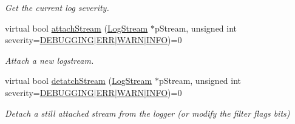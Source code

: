 \begin{DoxyCompactItemize}
\begin{DoxyCompactList}\small\item\em Get the current log severity. \end{DoxyCompactList}\item 
virtual bool \hyperlink{class_assimp_1_1_logger_a56fbf4f392712f06d3c5bb581c3f3906}{attach\-Stream} (\hyperlink{class_assimp_1_1_log_stream}{Log\-Stream} $\ast$p\-Stream, unsigned int severity=\hyperlink{class_assimp_1_1_logger_acd0b52a87d6fc11e957ed2c6e2ad75b6a1c233dd8bb46dc4386948a03877b8160}{D\-E\-B\-U\-G\-G\-I\-N\-G}$\vert$\hyperlink{class_assimp_1_1_logger_acd0b52a87d6fc11e957ed2c6e2ad75b6a2dd325191d60507ab0afd01ea3add8d1}{E\-R\-R}$\vert$\hyperlink{class_assimp_1_1_logger_acd0b52a87d6fc11e957ed2c6e2ad75b6abea27a64e7f7cc758549526f953c26f2}{W\-A\-R\-N}$\vert$\hyperlink{class_assimp_1_1_logger_acd0b52a87d6fc11e957ed2c6e2ad75b6a5631a164f078d5f7e8780cf88d1d45d6}{I\-N\-F\-O})=0
\begin{DoxyCompactList}\small\item\em Attach a new logstream. \end{DoxyCompactList}\item 
virtual bool \hyperlink{class_assimp_1_1_logger_ac89b2edd326dda9046fe9d4e1f4d10fc}{detatch\-Stream} (\hyperlink{class_assimp_1_1_log_stream}{Log\-Stream} $\ast$p\-Stream, unsigned int severity=\hyperlink{class_assimp_1_1_logger_acd0b52a87d6fc11e957ed2c6e2ad75b6a1c233dd8bb46dc4386948a03877b8160}{D\-E\-B\-U\-G\-G\-I\-N\-G}$\vert$\hyperlink{class_assimp_1_1_logger_acd0b52a87d6fc11e957ed2c6e2ad75b6a2dd325191d60507ab0afd01ea3add8d1}{E\-R\-R}$\vert$\hyperlink{class_assimp_1_1_logger_acd0b52a87d6fc11e957ed2c6e2ad75b6abea27a64e7f7cc758549526f953c26f2}{W\-A\-R\-N}$\vert$\hyperlink{class_assimp_1_1_logger_acd0b52a87d6fc11e957ed2c6e2ad75b6a5631a164f078d5f7e8780cf88d1d45d6}{I\-N\-F\-O})=0
\begin{DoxyCompactList}\small\item\em Detach a still attached stream from the logger (or modify the filter flags bits) \end{DoxyCompactList}\end{DoxyCompactItemize}
